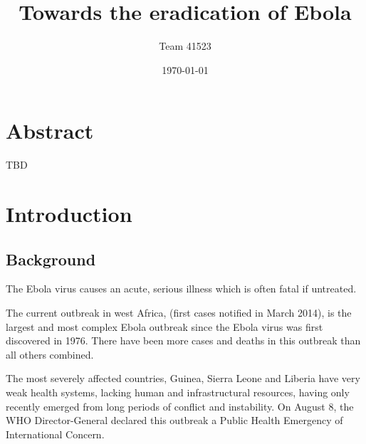 \documentclass[12pt]{article}
\title{Towards the eradication of Ebola}
\author{Team 41523}
\date{\today}
\begin{document}
	\maketitle
	
\section*{Abstract}
TBD



\newpage


\tableofcontents

\newpage





\section{Introduction}
\subsection{Background}




The Ebola virus causes an acute, serious illness which is often fatal if untreated. 

The current outbreak in west Africa, (first cases notified in March 2014), is the largest and most complex Ebola outbreak since the Ebola virus was first discovered in 1976. There have been more cases and deaths in this outbreak than all others combined. 

The most severely affected countries, Guinea, Sierra Leone and Liberia have very weak health systems, lacking human and infrastructural resources, having only recently emerged from long periods of conflict and instability. On August 8, the WHO Director-General declared this outbreak a Public Health Emergency of International Concern.
\end{document}
